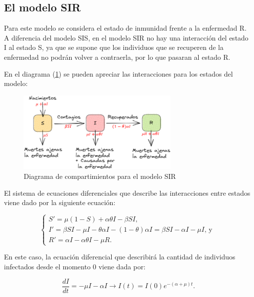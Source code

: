 \subsection{El modelo SIR}\label{sub:El modelo SIR}

Para este modelo se considera el estado de inmunidad frente a la enfermedad R. A diferencia del modelo SIS, en el modelo SIR no hay una interacción del estado I al estado S, ya que se supone que los individuos que se recuperen de la enfermedad no podrán volver a contraerla, por lo que pasaran al estado R. 

En el diagrama (\ref{fig:diagrama SIR}) se pueden apreciar las interacciones para los estados del modelo:

\begin{figure}[h]
  \centering
    \includegraphics[width=0.7\textwidth]{Imagenes/SIR_compartimientos.PNG}
  \caption{Diagrama de compartimientos para el modelo SIR}
  \label{fig:diagrama SIR}
\end{figure}

El sistema de ecuaciones diferenciales que describe las interacciones entre estados viene dado por la siguiente ecuación:

\begin{equation}\label{eq:Modelo SIR}
\left\{
\begin{array}{l}
S' = \mu(1 - S) + \alpha\theta I - \beta S I, \\
I' = \beta S I - \mu I - \theta\alpha I - (1 - \theta)\alpha I = \beta S I - \alpha I - \mu I\text{, y } \\
R' = \alpha I - \alpha\theta I - \mu R.
\end{array}
\right.
\end{equation}

En este caso, la ecuación diferencial que describirá la cantidad de individuos infectados desde el momento 0 viene dada por:

\begin{equation}\label{eq:Infectados en el tiempo I - SIR}
    \frac{dI}{dt}=-\mu I - \alpha I \longrightarrow I(t)=I(0)e^{-(\alpha+\mu)t}.
\end{equation}


